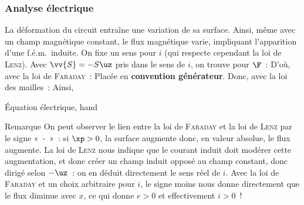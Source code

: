 \documentclass[../main/main.tex]{subfiles}
\begin{document}
\subsubsection{Analyse électrique}
\label{sssec:rlplgene_anaelec}
La déformation du circuit entraîne une variation de sa surface. Ainsi, même avec
un champ magnétique constant, le flux magnétique varie, impliquant l'apparition
d'une f.é.m.\ induite.
\bigbreak
\noindent
On fixe un sens pour $i$ (qui respecte cependant la loi de \textsc{Lenz}).
Avec $\vv{S} = -S\uz$ pris dans le sens de $i$, on trouve pour $\F$~:
D'où, avec la loi de \textsc{Faraday}~:
Placée en \textbf{convention générateur}. Donc, avec la loi des mailles~:
Ainsi,
\begin{tprop}{Équation électrique, hand}
\end{tprop}

\begin{rrema}{Remarque}
	On peut observer le lien entre la loi de \textsc{Faraday} et la loi de
	\textsc{Lenz} par le signe «~-~»~: si $\xp > 0$, la surface augmente donc, en
	valeur absolue, le flux augmente. La loi de \textsc{Lenz} nous indique que le
	courant induit doit modérer cette augmentation, et donc créer un champ induit
	opposé au champ constant, donc dirigé selon $-\uz$~: on en déduit directement
	le sens réel de $i$.
	\smallbreak
	Avec la loi de \textsc{Faraday} et un choix arbitraire pour $i$, le signe
	moins nous donne directement que le flux diminue avec $x$, ce qui donne $e >
		0$ et effectivement $i > 0$~!
\end{rrema}
\end{document}
